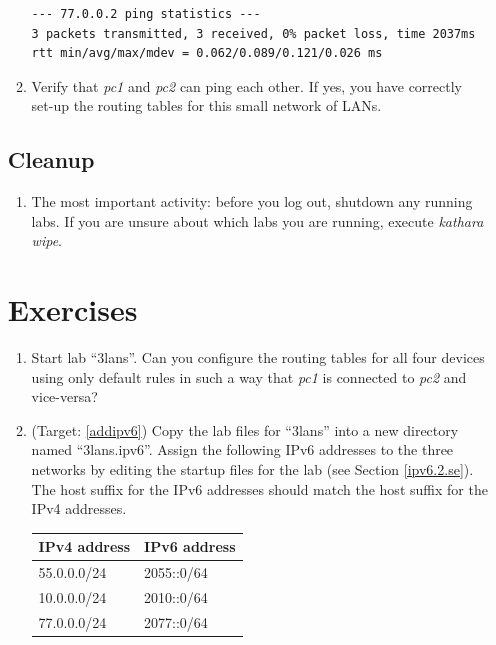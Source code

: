\documentclass[12pt]{book}
\begin{document}
\begin{enumerate}[label=\arabic*.]
\begin{enumerate}[resume*]
\begin{lstlisting}
--- 77.0.0.2 ping statistics ---
3 packets transmitted, 3 received, 0% packet loss, time 2037ms
rtt min/avg/max/mdev = 0.062/0.089/0.121/0.026 ms
  \end{lstlisting}

  \item Verify that \emph{pc1} and \emph{pc2} can ping each other. If yes, you have correctly set-up the routing tables for this small network of LANs.
\end{enumerate}

\subsection{Cleanup}

\begin{enumerate}[resume*]
\item The most important activity: before you log out, shutdown any running labs. If you are unsure about which labs you are running, execute \emph{kathara wipe}.
\end{enumerate}


\section{Exercises}

\begin{enumerate}
\item Start lab ``3lans''. Can you configure the routing tables for all four devices  using only default rules in such a way that \emph{pc1} is connected to \emph{pc2} and vice-versa?

\item\label{ipv6.3.ex} (Target: \ref{addipv6}) Copy the lab files for ``3lans'' into a new directory named ``3lans.ipv6''. Assign the following IPv6 addresses to the three networks by editing the startup files for the lab (see Section \ref{ipv6.2.se}). The host suffix for the IPv6 addresses should match the host suffix for the IPv4 addresses.

  \begin{tabular}{l l} \toprule
    IPv4 address  & IPv6 address \\ \midrule
    55.0.0.0/24 & 2055::0/64 \\
    10.0.0.0/24 & 2010::0/64 \\
    77.0.0.0/24 & 2077::0/64\\ \bottomrule
  \end{tabular}


\end{enumerate}
\end{enumerate}
\end{document}
